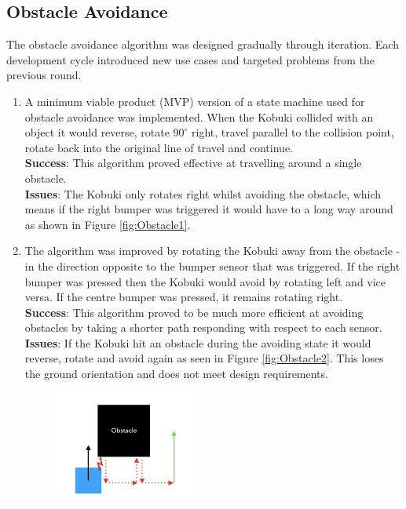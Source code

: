 \subsection{Obstacle Avoidance}\label{sec:obstacle_alg}
\vspace{-0.2cm} The obstacle avoidance algorithm was designed gradually through iteration. Each development cycle introduced new use cases and targeted problems from the previous round. %
\begin{enumerate}
    \item A minimum viable product (MVP) version of a state machine used for obstacle avoidance was implemented. When the Kobuki collided with an object it would reverse, rotate $90^\circ$ right, travel parallel to the collision point, rotate back into the original line of travel and continue.\\
    \textbf{Success}: This algorithm proved effective at travelling around a single obstacle.\\
    \textbf{Issues}: The Kobuki only rotates right whilst avoiding the obstacle, which means if the right bumper was triggered it would have to a long way around as shown in Figure \ref{fig:Obstacle1}.
    \item The algorithm was improved by rotating the Kobuki away from the obstacle - in the direction opposite to the bumper sensor that was triggered. If the right bumper was pressed then the Kobuki would avoid by rotating left and vice versa. If the centre bumper was pressed, it remains rotating right.\\
    \textbf{Success}: This algorithm proved to be much more efficient at avoiding obstacles by taking a shorter path responding with respect to each sensor.\\
    \textbf{Issues}: If the Kobuki hit an obstacle during the avoiding state it would reverse, rotate and avoid again as seen in Figure \ref{fig:Obstacle2}. This loses the ground orientation and does not meet design requirements.
    \begin{figure}[H]
    \centering
    \begin{minipage}{0.45\textwidth}
        \centering
        \vspace{0.5cm}
        \includegraphics[width=4.6cm]{Images/Obstacle1.png}

\end{minipage}
\end{figure}
\end{enumerate}
